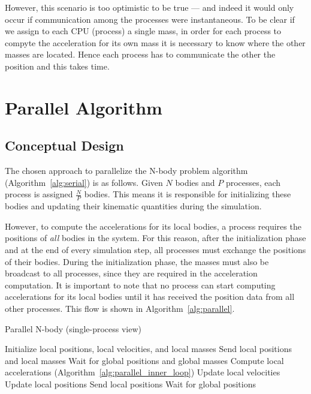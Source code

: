 \documentclass{article}
\begin{document}
However, this scenario is too optimistic to be true — and indeed it would only occur if communication among the processes were instantaneous. To be clear if we assign to each CPU (process) a single mass, in order for each process to compyte the acceleration for its own mass it is necessary to know where the other masses are located. Hence each process has to communicate the other the position and this takes time.

\section{Parallel Algorithm}
\subsection{Conceptual Design}
The chosen approach to parallelize the N-body problem algorithm (Algorithm~\ref{alg:serial}) is as follows.  
Given $N$ bodies and $P$ processes, each process is assigned $\frac{N}{P}$ bodies.  
This means it is responsible for initializing these bodies and updating their kinematic quantities during the simulation.  

However, to compute the accelerations for its local bodies, a process requires the positions of \emph{all} bodies in the system.  
For this reason, after the initialization phase and at the end of every simulation step, all processes must exchange the positions of their bodies.  
During the initialization phase, the masses must also be broadcast to all processes, since they are required in the acceleration computation.
It is important to note that no process can start computing accelerations for its local bodies until it has received the position data from all other processes.
This flow is shown in Algorithm~\ref{alg:parallel}.

\begin{algorithm}[H]
\caption{Parallel N-body (single-process view)}
\label{alg:parallel}
\begin{algorithmic}[1]
\State Initialize local positions, local velocities, and local masses
\State Send local positions and local masses
\State Wait for global positions and global masses
    \State Compute local accelerations (Algorithm~\ref{alg:parallel_inner_loop})
    \State Update local velocities
    \State Update local positions
    \State Send local positions
    \State Wait for global positions
\EndFor
\end{algorithmic}
\end{algorithm}
\end{document}
